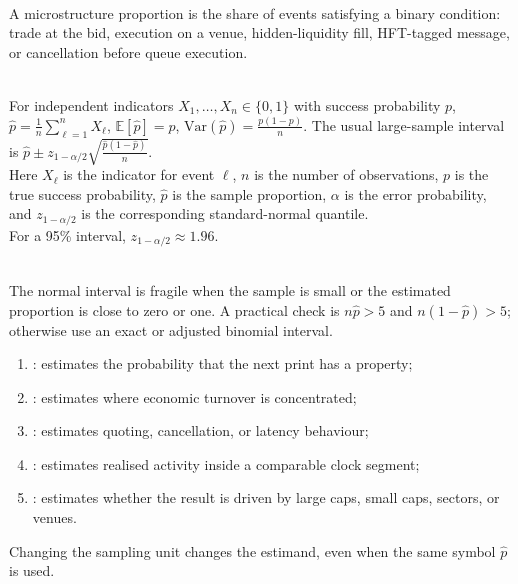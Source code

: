 \documentclass[a4paper,oneside,openany]{book}
\begin{document}
\begin{definition} \\
A microstructure proportion is the share of events satisfying a binary condition: trade at the bid, execution on a venue, hidden-liquidity fill, HFT-tagged message, or cancellation before queue execution.
\end{definition}

\begin{model} \\
For independent indicators $X_1,\ldots,X_n\in\{0,1\}$ with success probability $p$,\\
$\hat{p}=\frac{1}{n}\sum\limits_{\ell=1}^{n}X_\ell$, $\mathbb{E}[\hat{p}]=p$, $\mathrm{Var}(\hat{p})=\frac{p(1-p)}{n}$. The usual large-sample interval is $\hat{p}\pm z_{1-\alpha/2}\sqrt{\frac{\hat{p}(1-\hat{p})}{n}}$.\\
Here $X_\ell$ is the indicator for event $\ell$, $n$ is the number of observations, $p$ is the true success probability, $\hat{p}$ is the sample proportion, $\alpha$ is the error probability, and $z_{1-\alpha/2}$ is the corresponding standard-normal quantile.\\
For a 95\% interval, $z_{1-\alpha/2}\approx1.96$.
\end{model}

\begin{caveat} \\
The normal interval is fragile when the sample is small or the estimated proportion is close to zero or one. A practical check is $n\hat{p}>5$ and $n(1-\hat{p})>5$; otherwise use an exact or adjusted binomial interval.
\end{caveat}

\begin{taxonomy} 
\begin{enumerate}[label=\roman*.]
\setlength{\itemsep}{0pt}
\item {}: estimates the probability that the next print has a property;
\item {}: estimates where economic turnover is concentrated;
\item {}: estimates quoting, cancellation, or latency behaviour;
\item {}: estimates realised activity inside a comparable clock segment;
\item {}: estimates whether the result is driven by large caps, small caps, sectors, or venues.
\end{enumerate}
Changing the sampling unit changes the estimand, even when the same symbol $\hat{p}$ is used.
\end{taxonomy}
\end{document}
